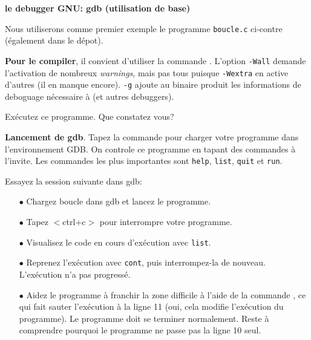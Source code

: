 \documentclass[10pt]{article}\usepackage[nu]{esial}
\begin{document}
\begin{Exercice}\textbf{le debugger GNU: gdb (utilisation de base)}

  \noindent\begin{minipage}[b]{.6\linewidth}
    Nous utiliserons comme premier exemple le programme \texttt{boucle.c}
    ci-contre (également dans le dépot).  \smallskip

    \textbf{Pour le compiler}, il convient d'utiliser la commande . L'option \texttt{-Wall} demande
    l'activation de nombreux \textit{warnings}, mais pas tous puisque
    \texttt{-Wextra} en active d'autres (il en manque encore).  \texttt{-g}
    ajoute au binaire produit les informations de deboguage nécessaire à
     (et autres debuggers).

    \Question Exécutez ce programme. Que constatez vous?
    \smallskip

    \textbf{Lancement de gdb}. Tapez la commande  pour
    charger votre programme dans l'environnement GDB.  On controle ce programme
    en tapant des commandes à l'invite. Les commandes les plus importantes sont
    \texttt{help}, \texttt{list}, \texttt{quit} et \texttt{run}.

    \Question Essayez la session suivante dans gdb:
    \begin{itemize}
    \item[$\bullet$] Chargez boucle dans gdb et lancez le programme. 
    \item[$\bullet$] Tapez $<$ctrl+c$>$ pour interrompre votre programme.
    \item[$\bullet$] Visualisez le code en cours d'exécution avec
      \texttt{list}.\vspace{.2\baselineskip}
    \end{itemize}

  \end{minipage}\hfill\begin{minipage}[b]{.38\linewidth}
  \end{minipage}

  \vspace{.2\baselineskip}\noindent
  \begin{minipage}{\linewidth}
  \begin{itemize}
  \item[$\bullet$] Reprenez l'exécution avec \texttt{cont}, puis interrompez-la
    de nouveau. L'exécution n'a pas progressé.
  \item[$\bullet$] Aidez le programme à franchir la zone difficile à l'aide de
    la commande , ce qui fait sauter l'exécution à la ligne 11
    (oui, cela modifie l'exécution du programme). Le programme doit
    se terminer normalement. Reste à comprendre pourquoi le programme ne passe
    pas la ligne 10 seul.
  \end{itemize}
  \end{minipage}


\end{Exercice}
\end{document}
